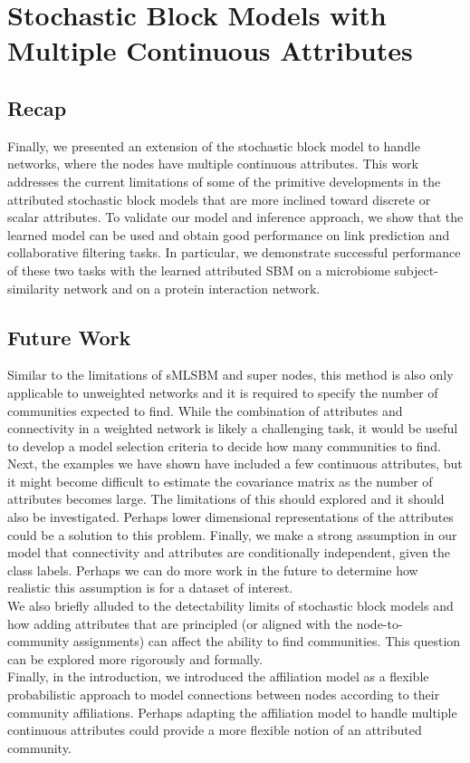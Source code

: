 \section{Stochastic Block Models with Multiple Continuous Attributes}
\subsection{Recap}
Finally, we presented an extension of the stochastic block model to handle networks, where the nodes have multiple continuous attributes. This work addresses the current limitations of some of the primitive developments in the attributed stochastic block models that are more inclined toward discrete or scalar attributes. To validate our model and inference approach, we show that the learned model can be used and obtain good performance on link prediction and collaborative filtering tasks. In particular, we demonstrate successful performance of these two tasks with the learned attributed SBM on a microbiome subject-similarity network and on a protein interaction network.
\subsection{Future Work}
Similar to the limitations of sMLSBM and super nodes, this method is also only applicable to unweighted networks and it is required to specify the number of communities expected to find. While the combination of attributes and connectivity in a weighted network is likely a challenging task, it would be useful to develop a model selection criteria to decide how many communities to find. Next, the examples we have shown have included a few continuous attributes, but it might become difficult to estimate the covariance matrix as the number of attributes becomes large. The limitations of this should explored and it should also be investigated. Perhaps lower dimensional representations of the attributes could be a solution to this problem. Finally, we make a strong assumption in our model that connectivity and attributes are conditionally independent, given the class labels. Perhaps we can do more work in the future to determine how realistic this assumption is for a dataset of interest. \\
\indent We also briefly alluded to the detectability limits of stochastic block models and how adding attributes that are principled (or aligned with the node-to-community assignments) can affect the ability to find communities. This question can be explored more rigorously and formally. \\
\indent Finally, in the introduction, we introduced the affiliation model as a flexible probabilistic approach to model connections between nodes according to their community affiliations. Perhaps adapting the affiliation model to handle multiple continuous attributes could provide a more flexible notion of an attributed community. 

